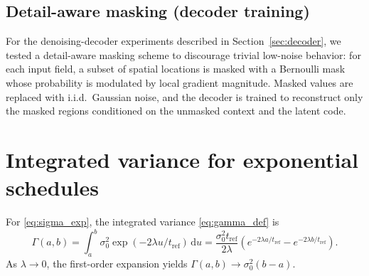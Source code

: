 \documentclass[review,onefignum,onetabnum]{siamart250211}
\newcommand{\dd}{\,\mathrm{d}}
\newcommand{\1}{\mathbf{1}}
\begin{document}
\subsection{Detail-aware masking (decoder training)}\label{app:masking}
For the denoising-decoder experiments described in Section~\ref{sec:decoder}, we tested a detail-aware masking scheme to discourage trivial low-noise behavior: for each input field, a subset of spatial locations is masked with a Bernoulli mask whose probability is modulated by local gradient magnitude. Masked values are replaced with i.i.d.\ Gaussian noise, and the decoder is trained to reconstruct only the masked regions conditioned on the unmasked context and the latent code.

\section{Integrated variance for exponential schedules}\label{app:gamma}
For \eqref{eq:sigma_exp}, the integrated variance \eqref{eq:gamma_def} is
\begin{equation}
\Gamma(a,b)=\int_a^b \sigma_0^2\exp(-2\lambda u/t_{\mathrm{ref}})\dd u
=\frac{\sigma_0^2 t_{\mathrm{ref}}}{2\lambda}
\left(e^{-2\lambda a/t_{\mathrm{ref}}}-e^{-2\lambda b/t_{\mathrm{ref}}}\right).
\label{eq:gamma_exp}
\end{equation}
As $\lambda\to 0$, the first-order expansion yields $\Gamma(a,b)\to \sigma_0^2(b-a)$.
\end{document}
